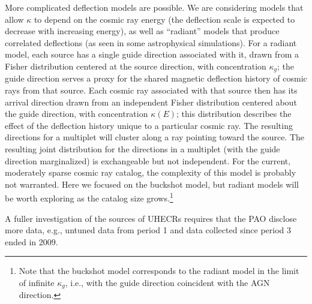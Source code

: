 More complicated deflection models are possible.  We are considering models
that allow $\kappa$ to depend on the cosmic ray energy (the deflection scale
is expected to decrease with increasing energy), as well as ``radiant''
models that produce correlated deflections (as seen in some astrophysical
simulations).  For a radiant model, each source has a single guide direction
associated with it, drawn from a Fisher distribution centered at the source
direction, with concentration $\kappa_g$; the guide direction serves a proxy
for the shared magnetic deflection history of cosmic rays from that source.
Each cosmic ray associated with that source then has its arrival direction
drawn from an independent Fisher distribution centered about the guide
direction, with concentration $\kappa(E)$; this distribution describes the
effect of the deflection history unique to a particular cosmic ray.  The
resulting directions for a multiplet will cluster along a ray pointing
toward the source.  The resulting joint distribution for the directions in a
multiplet (with the guide direction marginalized) is exchangeable but not
independent.  For the current, moderately sparse cosmic ray catalog, the
complexity of this model is probably not warranted.  Here we focused on the
buckshot model, but radiant models will be worth exploring as the catalog
size grows.\footnote{Note that the buckshot model corresponds to the
radiant model in the limit of infinite $\kappa_g$, i.e., with the
guide direction coincident with the AGN direction.}

A fuller investigation of the sources of UHECRs requires that the PAO disclose more data, e.g., untuned data from period 1
and data collected since period 3 ended in 2009.  



